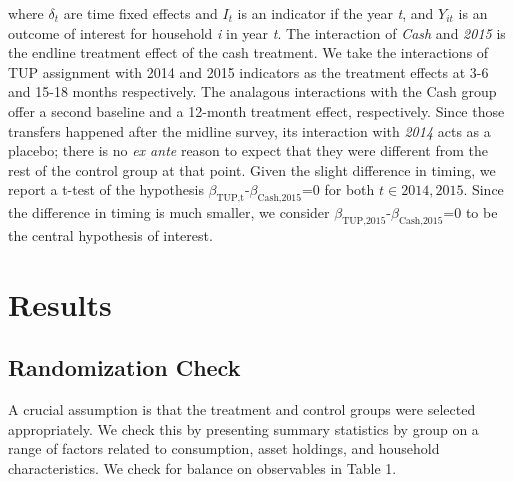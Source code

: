 \documentclass[12pt,article]{article}
\begin{document}
where \(\delta_{t}\) are time fixed effects and \(I_{t}\) is an indicator if the year
\emph{t}, and \(Y_{it}\) is an outcome of interest for household \emph{i} in year \emph{t}. The
interaction of \emph{Cash} and \emph{2015} is the endline treatment effect of the cash
treatment. We take the interactions of TUP assignment with 2014 and 2015 indicators
as the treatment effects at 3-6 and 15-18 months respectively. The analagous
interactions with the Cash group offer a second baseline and a 12-month treatment
effect, respectively. Since those transfers happened after the midline survey, its
interaction with \emph{2014} acts as a placebo; there is no \emph{ex ante} reason to expect
that they were different from the rest of the control group at that point.
Given the slight difference in timing, we report a t-test of the hypothesis
\(\beta_{\text{TUP,t}}\)-\(\beta_{\text{Cash,2015}}\)=0 for both \(t \in {2014,2015}\). Since the difference
in timing is much smaller, we consider \(\beta_{\text{TUP,2015}}\)-\(\beta_{\text{Cash,2015}}\)=0 to be the
central hypothesis of interest.

\section{Results}
\label{sec:orgheadline16}
\subsection{Randomization Check}
\label{sec:orgheadline7}

A crucial assumption is that the treatment and control groups were selected
appropriately. We check this by presenting summary statistics by group on a
range of factors related to consumption, asset holdings, and household
characteristics. We check for balance on observables in Table 1.
\end{document}
